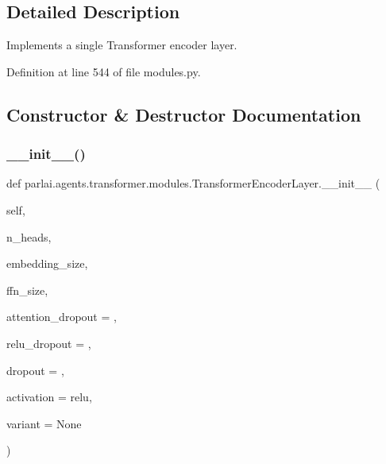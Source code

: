 \subsection{Detailed Description}
\begin{DoxyVerb}Implements a single Transformer encoder layer.
\end{DoxyVerb}
 

Definition at line 544 of file modules.\+py.



\subsection{Constructor \& Destructor Documentation}
\mbox{\label{classparlai_1_1agents_1_1transformer_1_1modules_1_1TransformerEncoderLayer_a68caa3f119bfb946e34b7cf3c8bd9e48}} 
\subsubsection{\texorpdfstring{\+\_\+\+\_\+init\+\_\+\+\_\+()}{\_\_init\_\_()}}
{\footnotesize\ttfamily def parlai.\+agents.\+transformer.\+modules.\+Transformer\+Encoder\+Layer.\+\_\+\+\_\+init\+\_\+\+\_\+ (\begin{DoxyParamCaption}\item[{}]{self,  }\item[{}]{n\+\_\+heads,  }\item[{}]{embedding\+\_\+size,  }\item[{}]{ffn\+\_\+size,  }\item[{}]{attention\+\_\+dropout = {},  }\item[{}]{relu\+\_\+dropout = {},  }\item[{}]{dropout = {},  }\item[{}]{activation = {\ttfamily \textquotesingle{}relu\textquotesingle{}},  }\item[{}]{variant = {\ttfamily None} }\end{DoxyParamCaption})}



